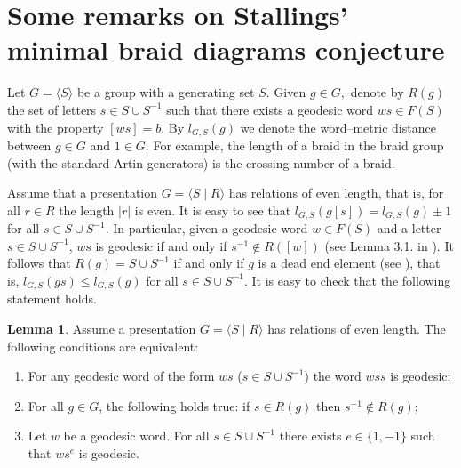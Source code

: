 \documentclass[11pt]{amsart}
\theoremstyle{plain}
\theoremstyle{definition}
\newtheorem{Lemma}[Theorem]{Lemma}
\numberwithin{equation}{section}
\begin{document}
\section{Some remarks on Stallings' minimal braid diagrams conjecture}

Let $G = \langle S \rangle$ be a group with a generating set $S$. Given $g \in G,$ denote by $R(g)$ the set of letters $s \in S\cup S^{-1}$ such that there exists a geodesic word $ws \in F(S)$ with the property $[ws] = b$. By $l_{G,S}(g)$ we denote the word--metric distance between $g \in G$ and $1 \in G$. For example, the length of a braid in the braid group (with the standard Artin generators) is the crossing number of a braid.

Assume that a presentation $G = \langle S \mid R\rangle$ has relations of even length, that is, for all $r \in R$ the length $|r|$ is even. It is easy to see that $l_{G,S}(g[s]) = l_{G,S}(g) \pm 1$ for all $s \in S\cup S^{-1}$. In particular, given a geodesic word $w \in F(S)$ and a letter $s \in S\cup S^{-1}$, $ws$ is geodesic if and only if $s^{-1} \notin R([w])$ (see Lemma 3.1. in \cite{IsobelWebster}). It follows that $R(g) = S \cup S^{-1}$ if and only if $g$ is a dead end element (see \cite{OH}), that is, $l_{G,S}(gs) \leq l_{G,S}(g)$ for all $s \in S \cup S^{-1}$. It is easy to check that the following statement holds.

\begin{Lemma}\label{eq}
Assume a presentation $G = \langle S \mid R \rangle$ has relations of even length. The following conditions are equivalent:
\begin{enumerate}
\item For any geodesic word of the form $ws$ ($s \in S \cup S^{-1}$) the word $wss$ is geodesic;
\item For all $g \in G$, the following holds true: if $s \in R(g)$ then $s^{-1} \notin R(g)$;
\item Let $w$ be a geodesic word. For all $s \in S\cup S^{-1}$ there exists $e \in \{1,-1\}$ such that $ws^e$ is geodesic.
\end{enumerate}
\end{Lemma}
\end{document}
